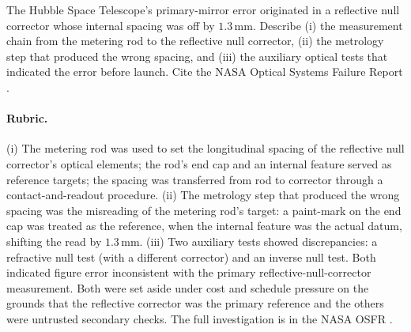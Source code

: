\begin{exercise}
The Hubble Space Telescope's primary-mirror error originated in a
reflective null corrector whose internal spacing was off by
$1.3 \,\si{\milli\meter}$. Describe (i) the measurement chain from
the metering rod to the reflective null corrector, (ii) the metrology
step that produced the wrong spacing, and (iii) the auxiliary optical
tests that indicated the error before launch. Cite the NASA Optical
Systems Failure Report \cite{acc:nasa-hubble-optical-systems-1990}.

\paragraph{Rubric.} (i) The metering rod was used to set the
longitudinal spacing of the reflective null corrector's optical
elements; the rod's end cap and an internal feature served as
reference targets; the spacing was transferred from rod to corrector
through a contact-and-readout procedure. (ii) The metrology step
that produced the wrong spacing was the misreading of the metering
rod's target: a paint-mark on the end cap was treated as the
reference, when the internal feature was the actual datum, shifting
the read by $1.3 \,\si{\milli\meter}$. (iii) Two auxiliary tests
showed discrepancies: a refractive null test (with a different
corrector) and an inverse null test. Both indicated figure error
inconsistent with the primary reflective-null-corrector
measurement. Both were set aside under cost and schedule pressure
on the grounds that the reflective corrector was the primary
reference and the others were untrusted secondary checks. The full
investigation is in the NASA OSFR \cite{acc:nasa-hubble-optical-systems-1990}.
\end{exercise}

